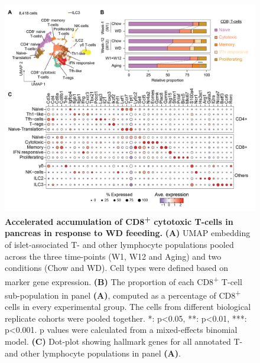 \begin{figure}[H]
\centering
\includegraphics[width=\linewidth]{Chapter4/Fig/F2-10-01.png}
\caption[res-tcells2]{\textbf{Accelerated accumulation of CD8\textsuperscript{+} cytotoxic T-cells in pancreas in response to WD feeeding.} \textbf{(A)} UMAP embedding of islet-associated T- and other lymphocyte populations pooled across the three time-points (W1, W12 and Aging) and two conditions (Chow and WD). Cell types were defined based on marker gene expression. \textbf{(B)} The proportion of each CD8\textsuperscript{+} T-cell sub-population in panel \textbf{(A)}, computed as a percentage of CD8\textsuperscript{+} cells in every experimental group. The cells from different biological replicate cohorts were pooled together. *: p<0.05, **: p<0.01, ***: p<0.001. p values were calculated from a mixed-effects binomial model. \textbf{(C)} Dot-plot showing hallmark genes for all annotated T- and other lymphocyte populations in panel \textbf{(A)}. 
}
\label{fig2-11}
\end{figure}


